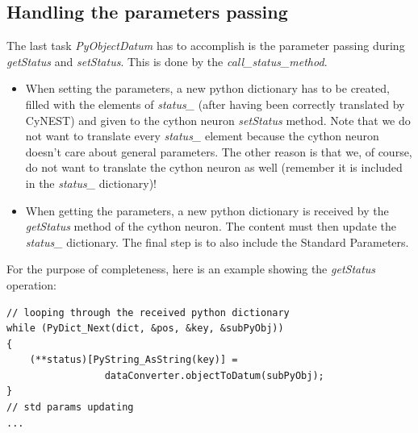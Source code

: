\documentclass{article}
\begin{document}
\subsection{Handling the parameters passing}
The last task \emph{PyObjectDatum} has to accomplish is the parameter passing during \emph{getStatus} and \emph{setStatus}. This is done by the \emph{call\_status\_method}.\\
\begin{itemize}
\item When setting the parameters, a new python dictionary has to be created, filled with the elements of \emph{status\_} (after having been correctly translated by CyNEST) and given to the cython neuron \emph{setStatus} method. Note that we do not want to translate every \emph{status\_} element because the cython neuron doesn't care about general parameters. The other reason is that we, of course, do not want to translate the cython neuron as well (remember it is included in the \emph{status\_} dictionary)!

\item When getting the parameters, a new python dictionary is received by the \emph{getStatus} method of the cython neuron. The content must then update the \emph{status\_} dictionary. The final step is to also include the Standard Parameters.
\end{itemize}
For the purpose of completeness, here is an example showing the \emph{getStatus} operation:
\begin{verbatim}
// looping through the received python dictionary
while (PyDict_Next(dict, &pos, &key, &subPyObj)) 
{
    (**status)[PyString_AsString(key)] = 
                 dataConverter.objectToDatum(subPyObj);
}
// std params updating
...
\end{verbatim}
\end{document}
